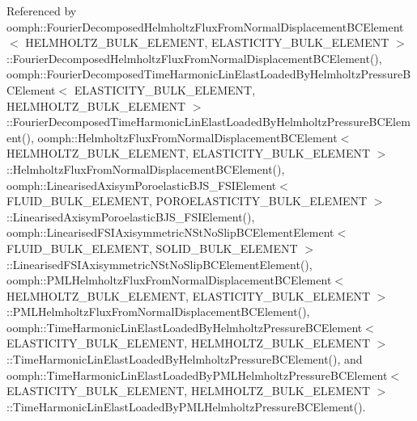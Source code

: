Referenced by oomph\+::\+Fourier\+Decomposed\+Helmholtz\+Flux\+From\+Normal\+Displacement\+B\+C\+Element$<$ H\+E\+L\+M\+H\+O\+L\+T\+Z\+\_\+\+B\+U\+L\+K\+\_\+\+E\+L\+E\+M\+E\+N\+T, E\+L\+A\+S\+T\+I\+C\+I\+T\+Y\+\_\+\+B\+U\+L\+K\+\_\+\+E\+L\+E\+M\+E\+N\+T $>$\+::\+Fourier\+Decomposed\+Helmholtz\+Flux\+From\+Normal\+Displacement\+B\+C\+Element(), oomph\+::\+Fourier\+Decomposed\+Time\+Harmonic\+Lin\+Elast\+Loaded\+By\+Helmholtz\+Pressure\+B\+C\+Element$<$ E\+L\+A\+S\+T\+I\+C\+I\+T\+Y\+\_\+\+B\+U\+L\+K\+\_\+\+E\+L\+E\+M\+E\+N\+T, H\+E\+L\+M\+H\+O\+L\+T\+Z\+\_\+\+B\+U\+L\+K\+\_\+\+E\+L\+E\+M\+E\+N\+T $>$\+::\+Fourier\+Decomposed\+Time\+Harmonic\+Lin\+Elast\+Loaded\+By\+Helmholtz\+Pressure\+B\+C\+Element(), oomph\+::\+Helmholtz\+Flux\+From\+Normal\+Displacement\+B\+C\+Element$<$ H\+E\+L\+M\+H\+O\+L\+T\+Z\+\_\+\+B\+U\+L\+K\+\_\+\+E\+L\+E\+M\+E\+N\+T, E\+L\+A\+S\+T\+I\+C\+I\+T\+Y\+\_\+\+B\+U\+L\+K\+\_\+\+E\+L\+E\+M\+E\+N\+T $>$\+::\+Helmholtz\+Flux\+From\+Normal\+Displacement\+B\+C\+Element(), oomph\+::\+Linearised\+Axisym\+Poroelastic\+B\+J\+S\+\_\+\+F\+S\+I\+Element$<$ F\+L\+U\+I\+D\+\_\+\+B\+U\+L\+K\+\_\+\+E\+L\+E\+M\+E\+N\+T, P\+O\+R\+O\+E\+L\+A\+S\+T\+I\+C\+I\+T\+Y\+\_\+\+B\+U\+L\+K\+\_\+\+E\+L\+E\+M\+E\+N\+T $>$\+::\+Linearised\+Axisym\+Poroelastic\+B\+J\+S\+\_\+\+F\+S\+I\+Element(), oomph\+::\+Linearised\+F\+S\+I\+Axisymmetric\+N\+St\+No\+Slip\+B\+C\+Element\+Element$<$ F\+L\+U\+I\+D\+\_\+\+B\+U\+L\+K\+\_\+\+E\+L\+E\+M\+E\+N\+T, S\+O\+L\+I\+D\+\_\+\+B\+U\+L\+K\+\_\+\+E\+L\+E\+M\+E\+N\+T $>$\+::\+Linearised\+F\+S\+I\+Axisymmetric\+N\+St\+No\+Slip\+B\+C\+Element\+Element(), oomph\+::\+P\+M\+L\+Helmholtz\+Flux\+From\+Normal\+Displacement\+B\+C\+Element$<$ H\+E\+L\+M\+H\+O\+L\+T\+Z\+\_\+\+B\+U\+L\+K\+\_\+\+E\+L\+E\+M\+E\+N\+T, E\+L\+A\+S\+T\+I\+C\+I\+T\+Y\+\_\+\+B\+U\+L\+K\+\_\+\+E\+L\+E\+M\+E\+N\+T $>$\+::\+P\+M\+L\+Helmholtz\+Flux\+From\+Normal\+Displacement\+B\+C\+Element(), oomph\+::\+Time\+Harmonic\+Lin\+Elast\+Loaded\+By\+Helmholtz\+Pressure\+B\+C\+Element$<$ E\+L\+A\+S\+T\+I\+C\+I\+T\+Y\+\_\+\+B\+U\+L\+K\+\_\+\+E\+L\+E\+M\+E\+N\+T, H\+E\+L\+M\+H\+O\+L\+T\+Z\+\_\+\+B\+U\+L\+K\+\_\+\+E\+L\+E\+M\+E\+N\+T $>$\+::\+Time\+Harmonic\+Lin\+Elast\+Loaded\+By\+Helmholtz\+Pressure\+B\+C\+Element(), and oomph\+::\+Time\+Harmonic\+Lin\+Elast\+Loaded\+By\+P\+M\+L\+Helmholtz\+Pressure\+B\+C\+Element$<$ E\+L\+A\+S\+T\+I\+C\+I\+T\+Y\+\_\+\+B\+U\+L\+K\+\_\+\+E\+L\+E\+M\+E\+N\+T, H\+E\+L\+M\+H\+O\+L\+T\+Z\+\_\+\+B\+U\+L\+K\+\_\+\+E\+L\+E\+M\+E\+N\+T $>$\+::\+Time\+Harmonic\+Lin\+Elast\+Loaded\+By\+P\+M\+L\+Helmholtz\+Pressure\+B\+C\+Element().

